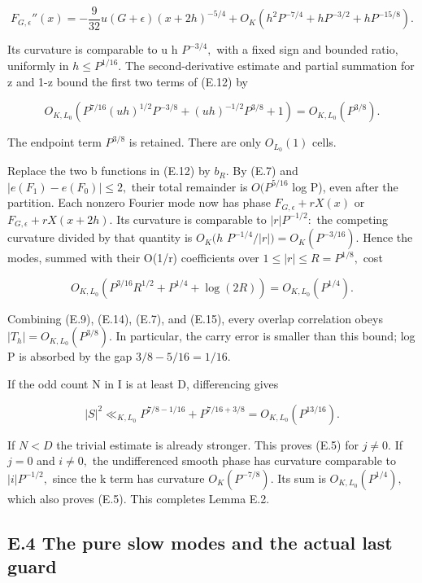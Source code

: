 \documentclass[11pt,a4paper]{article}
\begin{document}
\[
 F_{G,\epsilon}''(x)=-\frac9{32}u(G+\epsilon)(x+2h)^{-5/4}
     +O_K(h^2P^{-7/4}+hP^{-3/2}+hP^{-15/8}).
 \tag{E.13}
\]

Its curvature is comparable to u h \(P^{-3/4},\) with a fixed sign and
bounded ratio, uniformly in \(h\le P^{1/16}.\) The second-derivative
estimate and partial summation for z and 1-z bound the first two terms
of (E.12) by

\[
 O_{K,L_0}\left(P^{7/16}(uh)^{1/2}P^{-3/8}
                         +(uh)^{-1/2}P^{3/8}+1\right)
       =O_{K,L_0}(P^{3/8}).
 \tag{E.14}
\]

The endpoint term \(P^{3/8}\) is retained. There are only \(O_{L_0}(1)\)
cells.

Replace the two b functions in (E.12) by \(b_R.\) By (E.7) and
\(|e(F_1)-e(F_0)|\le 2,\) their total remainder is \(O(P^{5/16}\) log
P), even after the partition. Each nonzero Fourier mode now has phase
\(F_{G,\epsilon}+rX(x)\) or \(F_{G,\epsilon}+rX(x+2h).\) Its curvature
is comparable to \(|r|P^{-1/2}:\) the competing curvature divided by
that quantity is \(O_K(h\) \(P^{-1/4}/|r|)=O_K(P^{-3/16}).\) Hence the
modes, summed with their O(1/\textbar r\textbar) coefficients over
\(1\le |r|\le R=P^{1/8},\) cost

\[
 O_{K,L_0}\left(P^{3/16}R^{1/2}+P^{1/4}+\log(2R)\right)
                 =O_{K,L_0}(P^{1/4}).
 \tag{E.15}
\]

Combining (E.9), (E.14), (E.7), and (E.15), every overlap correlation
obeys \(|T_h|=O_{K,L_0}(P^{3/8}).\) In particular, the carry error is
smaller than this bound; log P is absorbed by the gap \(3/8-5/16=1/16.\)

If the odd count N in I is at least D, differencing gives

\[
 |S|^2\ll_{K,L_0} P^{7/8-1/16}+P^{7/16+3/8}
                     =O_{K,L_0}(P^{13/16}).
 \tag{E.16}
\]

If \(N<D\) the trivial estimate is already stronger. This proves (E.5)
for \(j\ne 0.\) If \(j=0\) and \(i\ne 0,\) the undifferenced smooth
phase has curvature comparable to \(|i|P^{-1/2},\) since the k term has
curvature \(O_K(P^{-7/8}).\) Its sum is \(O_{K,L_0}(P^{1/4}),\) which
also proves (E.5). This completes Lemma E.2.

\subsection{E.4 The pure slow modes and the actual last
guard}\label{e.4-the-pure-slow-modes-and-the-actual-last-guard}
\end{document}

